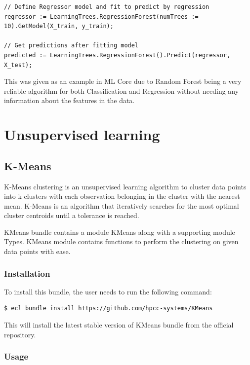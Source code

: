 \documentclass[a4paper,oneside,12pt]{book}
\begin{document}
\begin{lstlisting}
// Define Regressor model and fit to predict by regression
regressor := LearningTrees.RegressionForest(numTrees := 10).GetModel(X_train, y_train);

// Get predictions after fitting model
predicted := LearningTrees.RegressionForest().Predict(regressor, X_test);
\end{lstlisting}

This was given as an example in ML Core due to Random Forest being a very reliable algorithm for both Classification and Regression without needing any information about the features in the data.

\part{Unsupervised learning}\label{part:unsupe}

\chapter{K-Means}\label{unsupe:kmeans}

K-Means clustering is an unsupervised learning algorithm to cluster data points into k clusters with each observation belonging in the cluster with the nearest mean. K-Means is an algorithm that iteratively searches for the most optimal cluster centroids until a tolerance is reached.

KMeans bundle contains a module KMeans along with a supporting module Types. KMeans module contains functions to perform the clustering on given data points with ease.

\section{Installation}

To install this bundle, the user needs to run the following command:

\begin{lstlisting}[language=bash]
$ ecl bundle install https://github.com/hpcc-systems/KMeans
\end{lstlisting}

This will install the latest stable version of KMeans bundle from the official repository.

\section{Usage}
\end{document}
